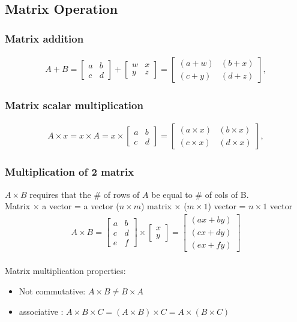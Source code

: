 \documentclass[a4paper,12pt]{report}
\begin{document}
\begin{appendices}
\subsection {Matrix Operation}
\subsubsection{Matrix addition}
 \begin{align*}
		A + B = \begin{bmatrix} a & b \\ c & d \end{bmatrix} + \begin{bmatrix} w & x \\ y & z\end{bmatrix} = \begin{bmatrix} (a+w) & (b+x) \\ (c+y) & (d+z)\end{bmatrix},
\end{align*}
\subsubsection{Matrix scalar multiplication}
\begin{align*}
	 A \times x = x \times A = x \times \begin{bmatrix} a & b \\ c & d \end{bmatrix} = \begin{bmatrix} (a\times x) & (b \times x) \\ (c \times x) & (d \times x)\end{bmatrix},
\end{align*}
\subsubsection{Multiplication of 2 matrix}
$ A \times B$ requires that the \# of rows of $A$ be equal to \# of cols of B. \\
Matrix $\times$ a vector = a vector ($n\times m$) matrix $\times$ ($m\times 1$) vector = $n \times 1$ vector
\begin{align*}
		A \times B = \begin{bmatrix} a & b \\ c & d \\ e & f \end{bmatrix} \times  \begin{bmatrix} x \\ y \end{bmatrix}= \begin{bmatrix} (ax + by) \\ (cx+dy) \\ (ex+fy)\end{bmatrix}
\end{align*}		
\\ 
Matrix multiplication  properties:
\begin{itemize}
\item Not commutative: $A \times B \neq B \times A$
\item associative : $A \times B \times C = (A \times B)\times C = A \times(B \times C)$
\end{itemize}

\end{appendices}
\end{document}
